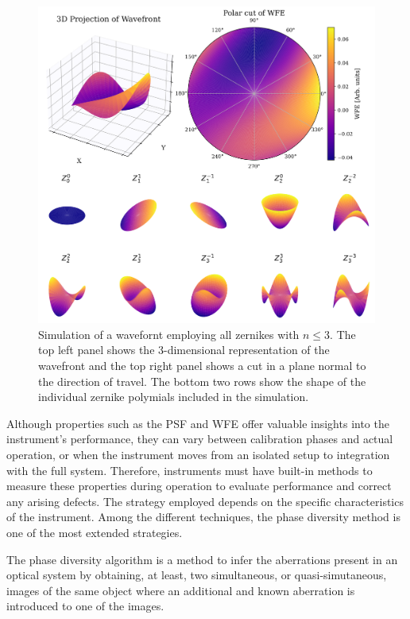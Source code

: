 \begin{figure}
  \centering
  \includegraphics[width = \textwidth]{figures/Introduction/zernikes_combined.pdf}
  \caption[Zernike representation of wavefront error.]{Simulation of a wavefornt employing all zernikes with $n \leqslant 3$. The top left panel shows the 3-dimensional representation of the wavefront and the top right panel shows a cut in a plane normal to the direction of travel. The bottom two rows show the shape of the individual zernike polymials included in the simulation.} 
  \label{fig_intro: zernikes}
\end{figure}

Although properties such as the PSF and WFE offer valuable insights into the instrument's performance, they can vary between calibration phases and actual operation, or when the instrument moves from an isolated setup to integration with the full system. Therefore, instruments must have built-in methods to measure these properties during operation to evaluate performance and correct any arising defects. The strategy employed depends on the specific characteristics of the instrument. Among the different techniques, the phase diversity method is one of the most extended strategies. 

The phase diversity algorithm \citep{PD_original} is a method to infer the aberrations present in an optical system by obtaining, at least, two simultaneous, or quasi-simutaneous, images of the same object where an additional and known aberration is introduced to one of the images.  

